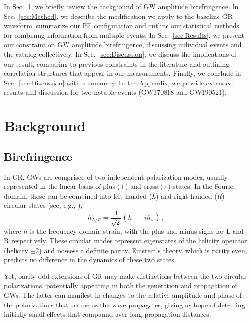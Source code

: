 \documentclass[aps,prd,twocolumn,superscriptaddress,preprintnumbers,nofootinbib]{revtex4-2}
\begin{document}
In Sec.~\ref{sec:Background}, we briefly review the background of \ac{GW} amplitude birefringence.
In Sec.~\ref{sec:Method}, we describe the modification we apply to the baseline \ac{GR} waveform, summarize our \ac{PE} configuration and outline our statistical methods for combining information from multiple events.
In Sec.~\ref{sec:Results}, we present our constraint on \ac{GW} amplitude birefringence, discussing individual events and the catalog collectively.
In Sec.~\ref{sec:Discussion}, we discuss the implications of our result, comparing to previous constraints in the literature and outlining correlation structures that appear in our measurements.
Finally, we conclude in Sec.~\ref{sec:Discussion} with a summary.
In the Appendix, we provide extended results and discussion for two notable events (GW170818 and GW190521).

\section{Background}
\label{sec:Background}

\subsection{Birefringence}
\label{sec:waveform}

In \ac{GR}, \acp{GW} are comprised of two independent polarization modes, usually represented in the linear basis of plus ($+$) and cross ($\times$) states.
In the Fourier domain, these can be combined into left-handed (\textit{L}) and right-handed (\textit{R}) circular states (see, e.g., \cite{Isi:2022mbx}),
\begin{equation}
    h_{L/R} = \frac{1}{\sqrt{2}}\left(h_+ \pm i h_\times\right)\,,
\end{equation}
where $h$ is the frequency domain strain, with the plus and minus signs for L and R respectively.
These circular modes represent eigenstates of the helicity operator (helicity $\pm2$) and possess a definite parity.
Einstein's theory, which is parity even, predicts no difference in the dynamics of these two states.

Yet, parity odd extensions of \ac{GR} may make distinctions between the two circular polarizations, potentially appearing in both the generation and propagation of \acp{GW}.
The latter can manifest in changes to the relative amplitude and phase of the polarizations that accrue as the wave propagates, giving us hope of detecting initially small effects that compound over long propagation distances.
\end{document}
